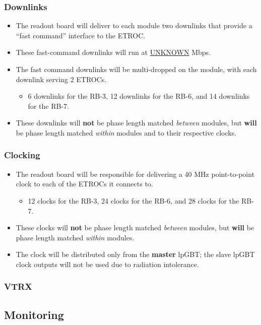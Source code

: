 \documentclass[11pt]{article}
\begin{document}
\subsubsection{Downlinks}
\label{sec:org4ecae42}
\begin{itemize}
\item The readout board will deliver to each module two downlinks that provide a ``fast command'' interface to the ETROC.
\item These fast-command downlinks will run at \uline{UNKNOWN} Mbps.
\item The fast command downlinks will be multi-dropped on the module, with each downlink serving 2 ETROCs.
\begin{itemize}
\item 6 downlinks for the RB-3, 12 downlinks for the RB-6, and 14 downlinks for the RB-7.
\end{itemize}
\item These downlinks will \textbf{not} be phase length matched \emph{between} modules, but \textbf{will} be phase length matched \emph{within} modules and to their respective clocks.
\end{itemize}
\subsubsection{Clocking}
\label{sec:org77f30c7}
\begin{itemize}
\item The readout board will be responsible for delivering a 40 MHz point-to-point clock to each of the ETROCs it connects to.
\begin{itemize}
\item 12 clocks for the RB-3, 24 clocks for the RB-6, and 28 clocks for the RB-7.
\end{itemize}
\item These clocks will \textbf{not} be phase length matched \emph{between} modules, but \textbf{will} be phase length matched \emph{within} modules.
\item The clock will be distributed only from the \textbf{master} lpGBT; the slave lpGBT clock outputs will not be used due to radiation intolerance.
\end{itemize}
\subsubsection{VTRX}
\label{sec:org1a567ec}
\subsection{Monitoring}
\label{sec:org0073a70}
\end{document}
